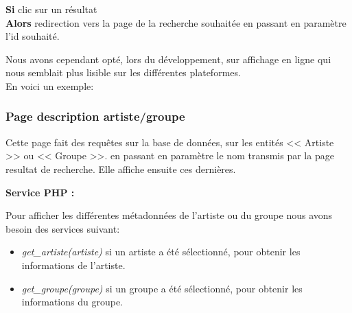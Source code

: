             \begin{paragraphe}
                \textbf{Si} clic sur un résultat\\
                \textbf{Alors} redirection vers la page de la recherche souhaitée en passant en paramètre l'id souhaité.
            \end{paragraphe}

            \begin{paragraphe}
                Nous avons cependant opté, lors du développement, sur affichage en ligne qui nous semblait plus lisible sur les différentes plateformes.\\
                En voici un exemple:
            \end{paragraphe}
            

        \clearpage

		\subsubsection{Page description artiste/groupe}
            \begin{paragraphe}
                Cette page fait des requêtes sur la base de données, sur les entités << Artiste >> ou << Groupe >>.
                 en passant en paramètre le nom transmis par la page resultat de recherche. Elle affiche ensuite ces dernières.
            \end{paragraphe}

            \begin{paragraphe}
                \textbf{Service PHP :}
            \end{paragraphe}

            \begin{paragraphe}
                Pour afficher les différentes métadonnées de l'artiste ou du groupe nous avons besoin des services suivant:
                \begin{itemize}
                        \item \emph{get\_artiste(artiste)} si un artiste a été sélectionné, pour obtenir les informations de l'artiste.
                        \item \emph{get\_groupe(groupe)} si un groupe a été sélectionné, pour obtenir les informations du groupe.
                \end{itemize}
            \end{paragraphe}

